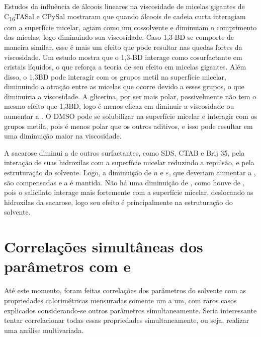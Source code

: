 		Estudos da influência de álcoois lineares na viscosidade de micelas gigantes de C\textsubscript{16}TASal e CPySal mostraram que quando álcoois de cadeia curta interagiam com a superfície micelar, agiam como um cossolvente e diminuiam o comprimento das micelas, logo diminuindo sua viscosidade. Caso 1,3-BD se comporte de maneira similar, esse é mais um efeito que pode resultar nas quedas fortes da viscosidade. Um estudo mostra que o 1,3-BD interage como cosurfactante em cristais líquidos, o que reforça a teoria de seu efeito em micelas gigantes. Além disso, o 1,3BD pode interagir com os grupos metil na superfície micelar, diminuindo a atração entre as micelas que ocorre devido a esses grupos, o que diminuiria a viscosidade. A glicerina, por ser mais polar, possivelmente não tem o mesmo efeito que 1,3BD, logo é menos eficaz em diminuir a viscosidade ou aumentar a \cmc. O DMSO pode se solubilizar na superfície micelar e interagir com os grupos metila, pois é menos polar que os outros aditivos, e isso pode resultar em uma diminuição maior na viscosidade. 
		
		
		A sacarose diminui a \cmc{} de outros surfactantes, como SDS, CTAB e Brij 35, pela interação de suas hidroxilas com a superfície micelar reduzindo a repulsão, e pela estruturação do solvente. Logo, a diminuição de \(n\) e \(\varepsilon\), que deveriam aumentar a \cwlm{}, são compensadas e a \cwlm{} é mantida. Não há uma diminuição de \cwlm, como houve de \cmc, pois o salicilato interage mais fortemente com a superfície micelar, deslocando as hidroxilas da sacarose, logo seu efeito é principalmente na estruturação do solvente.
		
		
		\section{Correlações simultâneas dos parâmetros com \cmc{} e \DHmic}
		
		Até este momento, foram feitas correlações dos parâmetros do solvente com as propriedades calorimétricas mensuradas somente um a um, com raros casos explicados considerando-se outros parâmetros simultaneamente. Seria interessante tentar correlacionar todas essas propriedades simultaneamente, ou seja, realizar uma análise multivariada.
		
